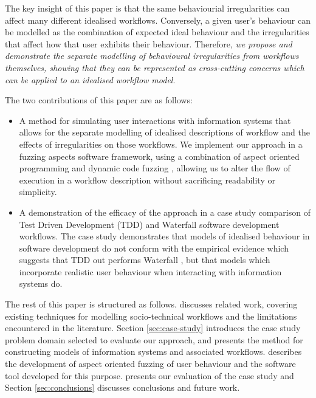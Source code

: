 \documentclass{llncs}
\begin{document}
The key insight of this paper is that the same behaviourial irregularities can affect many different idealised workflows.
Conversely, a given user's behaviour can be modelled as  the combination of expected ideal behaviour and the irregularities that
affect how that user exhibits their behaviour.  Therefore, \emph{we propose and demonstrate the separate
modelling of behavioural irregularities from workflows themselves, showing that they can be represented as cross-cutting concerns which can
be applied to an idealised workflow model}.

The two contributions of this paper are as follows:

\begin{itemize}

\item A method for simulating user interactions with information systems that allows for the separate modelling of
  idealised descriptions of workflow and the effects of irregularities on those workflows.  We implement our approach in
  a fuzzing aspects software framework, using a combination of aspect oriented programming \cite{filman01aspect} and
  dynamic code fuzzing \citep{takanen08fuzzing}, allowing us to alter the flow of execution in a workflow description
  without sacrificing readability or simplicity.

\item A demonstration of the efficacy of the approach in a case study comparison of Test Driven Development (TDD) and
  Waterfall software development workflows.  The case study demonstrates that models of idealised behaviour in software
  development do not conform with the empirical evidence which suggests that TDD out performs Waterfall
  \citep{Bhat2006TestDrivenDevelopment,George2004TestDrivenDevelopment,Huang2009EmpiricalTestFirstProgramming}, but that
  models which incorporate realistic user behaviour when interacting with information systems do.

\end{itemize}

The rest of this paper is structured as follows.   discusses related work, covering existing
techniques for modelling socio-technical workflows and the limitations encountered in the literature.  Section
\ref{sec:case-study} introduces the case study problem domain selected to evaluate our approach, and presents the method
for constructing models of information systems and associated workflows.  describes the
development of aspect oriented fuzzing of user behaviour and the software tool developed
for this purpose.   presents our evaluation of the case study and Section
\ref{sec:conclusions} discusses conclusions and future work.
\end{document}
